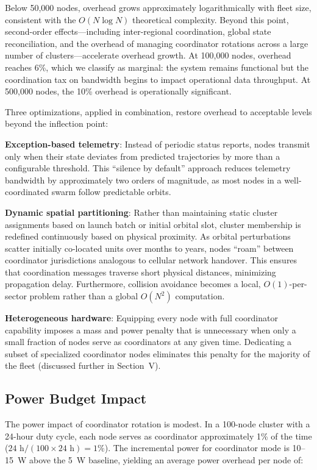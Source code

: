\documentclass[journal]{IEEEtran}
\begin{document}
Below 50{,}000 nodes, overhead grows approximately logarithmically with fleet size, consistent with the $O(N \log N)$ theoretical complexity. Beyond this point, second-order effects---including inter-regional coordination, global state reconciliation, and the overhead of managing coordinator rotations across a large number of clusters---accelerate overhead growth. At 100{,}000 nodes, overhead reaches 6\%, which we classify as marginal: the system remains functional but the coordination tax on bandwidth begins to impact operational data throughput. At 500{,}000 nodes, the 10\% overhead is operationally significant.

Three optimizations, applied in combination, restore overhead to acceptable levels beyond the inflection point:

\textbf{Exception-based telemetry}: Instead of periodic status reports, nodes transmit only when their state deviates from predicted trajectories by more than a configurable threshold. This ``silence by default'' approach reduces telemetry bandwidth by approximately two orders of magnitude, as most nodes in a well-coordinated swarm follow predictable orbits.

\textbf{Dynamic spatial partitioning}: Rather than maintaining static cluster assignments based on launch batch or initial orbital slot, cluster membership is redefined continuously based on physical proximity. As orbital perturbations scatter initially co-located units over months to years, nodes ``roam'' between coordinator jurisdictions analogous to cellular network handover. This ensures that coordination messages traverse short physical distances, minimizing propagation delay. Furthermore, collision avoidance becomes a local, $O(1)$-per-sector problem rather than a global $O(N^2)$ computation.

\textbf{Heterogeneous hardware}: Equipping every node with full coordinator capability imposes a mass and power penalty that is unnecessary when only a small fraction of nodes serve as coordinators at any given time. Dedicating a subset of specialized coordinator nodes eliminates this penalty for the majority of the fleet (discussed further in Section~V).

\subsection{Power Budget Impact}

The power impact of coordinator rotation is modest. In a 100-node cluster with a 24-hour duty cycle, each node serves as coordinator approximately 1\% of the time ($24\text{~h} / (100 \times 24\text{~h}) = 1\%$). The incremental power for coordinator mode is 10--15~W above the 5~W baseline, yielding an average power overhead per node of:
\end{document}
